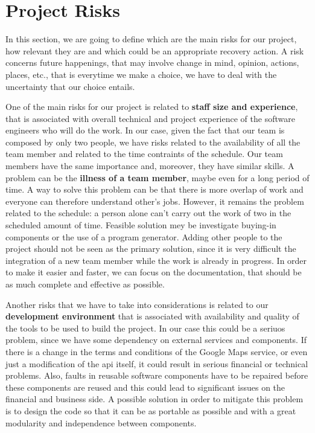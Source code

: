\section{Project Risks} \label{sec:proj-risks}

In this section, we are going to define which are the main risks for our project, how relevant they are and which could be an appropriate recovery action.
A risk concerns future happenings, that may involve change in mind, opinion, actions, places, etc., that is everytime we make a choice, we have to deal with the uncertainty that our choice entails.

One of the main risks for our project is related to \textbf{staff size and experience}, that is associated with overall technical and project experience of the software engineers who will do the work. In our case, given the fact that our team is composed by only two people, we have risks related to the availability of all the team member and related to the time contraints of the schedule.
Our team members have the same importance and, moreover, they have similar skills. A problem can be the \textbf{illness of a team member}, maybe even for a long period of time. A way to solve this problem can be that there is more overlap of work and everyone can therefore understand other's jobs. However, it remains the problem related to the schedule: a person alone can't carry out the work of two in the scheduled amount of time. Feasible solution mey be investigate buying-in components or the use of a program generator. Adding other people to the project should not be seen as the primary solution, since it is very difficult the integration of a new team member while the work is already in progress. In order to make it easier and faster, we can focus on the documentation, that should be as much complete and effective as possible.

Another risks that we have to take into considerations is related to our \textbf{development environment} that is associated with availability and quality of the tools to be used to build the project. In our case this could be a seriuos problem, since we have some dependency on external services and components. If there is a change in the terms and conditions of the Google Maps service, or even just a modification of the \acs{api} itself, it could result in serious financial or technical problems. Also, faults in reusable software components have to be repaired before these components are reused and this could lead to significant issues on the financial and business side. A possible solution in order to mitigate this problem is to design the code so that it can be as portable as possible and with a great modularity and independence between components.

